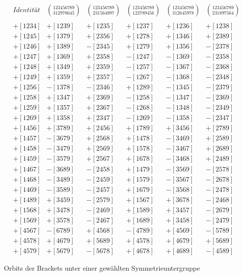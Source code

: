 \begin{table}[htb]
{\small
$$
\begin{array}{cccccc}
Identität                   & {123456789\choose 312978645} &
{123456789\choose 231564897} & {123456789\choose 123789456} &
{123456789\choose 312645978} & {123456789\choose 231897564}\\
        &         &         &         &         &        \\
+[1234] & +[1239] & +[1235] & +[1237] & +[1236] & +[1238]\\
+[1245] & +[1379] & +[2356] & +[1278] & +[1346] & +[2389]\\
+[1246] & +[1389] & -[2345] & +[1279] & +[1356] & -[2378]\\
+[1247] & +[1369] & +[2358] & -[1247] & -[1369] & -[2358]\\
+[1248] & +[1349] & +[2359] & -[1257] & -[1367] & -[2368]\\
+[1249] & +[1359] & +[2357] & -[1267] & -[1368] & -[2348]\\
+[1256] & -[1378] & -[2346] & +[1289] & -[1345] & -[2379]\\
+[1258] & +[1347] & +[2369] & -[1258] & -[1347] & -[2369]\\
+[1259] & +[1357] & +[2367] & -[1268] & -[1348] & -[2349]\\
+[1269] & +[1358] & +[2347] & -[1269] & -[1358] & -[2347]\\
+[1456] & +[3789] & +[2456] & +[1789] & +[3456] & +[2789]\\
+[1457] & -[3679] & +[2568] & +[1478] & -[3469] & +[2589]\\
+[1458] & -[3479] & +[2569] & +[1578] & -[3467] & +[2689]\\
+[1459] & -[3579] & +[2567] & +[1678] & -[3468] & +[2489]\\
+[1467] & -[3689] & -[2458] & +[1479] & -[3569] & -[2578]\\
+[1468] & -[3489] & -[2459] & +[1579] & -[3567] & -[2678]\\
+[1469] & -[3589] & -[2457] & +[1679] & -[3568] & -[2478]\\
+[1489] & +[3459] & -[2579] & +[1567] & +[3678] & -[2468]\\
+[1568] & +[3478] & -[2469] & +[1589] & +[3457] & -[2679]\\
+[1569] & +[3578] & -[2467] & +[1689] & +[3458] & -[2479]\\
+[4567] & -[6789] & +[4568] & -[4789] & +[4569] & -[5789]\\
+[4578] & +[4679] & +[5689] & +[4578] & +[4679] & +[5689]\\
+[4579] & +[5679] & -[5678] & +[4678] & +[4689] & -[4589]
\end{array}$$}
\caption{Orbits der Brackets unter einer gewählten Symmetrieuntergruppe}
\label{tab}
\end{table}

